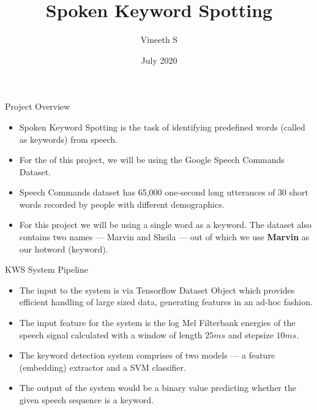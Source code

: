 \documentclass{beamer}
\title{Spoken Keyword Spotting}
\author{Vineeth S}
\date{July 2020}
\begin{document}
\justifying

\nocite{*}

\maketitle

\begin{frame}{Project Overview}
	\begin{itemize}
		\item<1-> Spoken Keyword Spotting is the task of identifying predefined words (called as keywords) from speech. 
		\item<2-> For the of this project, we will be using the Google Speech Commands Dataset\cite{gsc}.
		\item<3-> Speech Commands dataset has 65,000 one-second long utterances of 30 short words recorded by people with different demographics.
		\item<4-> For this project we will be using a single word as a keyword. The dataset also contains two names --- Marvin and Sheila --- out of which we use \textbf{Marvin }as our hotword (keyword).
	\end{itemize}
\end{frame}



\begin{frame}{KWS System Pipeline}
	\begin{itemize}
		\item<1-> The input to the system is via Tensorflow Dataset Object which provides efficient handling of large sized data, generating features in an ad-hoc fashion.
		\item<2-> The input feature for the system is the log Mel Filterbank energies of the speech signal calculated with a window of length $25ms$ and stepsize $10ms$.
		\item<3-> The keyword detection system comprises of two models --- a feature (embedding) extractor and a SVM classifier.
		\item<4-> The output of the system would be a binary value predicting whether the given speech sequence is a keyword.
	\end{itemize}
\end{frame}
\end{document}
